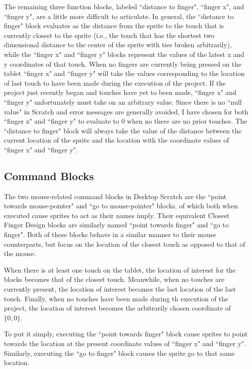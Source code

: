 The remaining three function blocks, labeled ``distance to finger", ``finger x", and ``finger y", are a little more difficult to articulate. In general, the ``distance to finger" block evaluates as the distance from the sprite to the touch that is currently closest to the sprite (i.e., the touch that has the shortest two dimensional distance to the center of the sprite with ties broken arbitrarily), while the ``finger x" and ``finger y" blocks represent the values of the latest x and y coordinates of that touch. When no fingers are currently being pressed on the tablet ``finger x" and ``finger y" will take the values corresponding to the location of last touch to have been made during the execution of the project. If the project just recently began and touches have yet to been made, ``finger x" and ``finger y" unfortunately must take on an arbitrary value. Since there is no ``null value" in Scratch and error messages are generally avoided, I have chosen for both ``finger x" and ``finger y" to evaluate to $0$ when no there are no prior touches. The ``distance to finger" block will always take the value of the distance between the current location of the sprite and the location with the coordinate values of ``finger x" and ``finger y".

\subsection{Command Blocks}
The two mouse-related command blocks in Desktop Scratch are the ``point towards mouse-pointer" and ``go to mouse-pointer" blocks, of which both when executed cause sprites to act as their names imply. Their equivalent Closest Finger Design blocks are similarly named ``point towards finger" and ``go to finger". Both of these blocks behave in a similar manner to their mouse counterparts, but focus on the location of the closest touch as opposed to that of the mouse.  

When there is at least one touch on the tablet, the location of interest for the blocks becomes that of the closest touch. Meanwhile, when no touches are currently present, the location of interest becomes the last location of the last touch. Finally, when no touches have been made during th execution of the project, the location of interest becomes the arbitrarily chosen coordinate of $\{0,0\}$.

To put it simply, executing the ``point towards finger" block cause sprites to point towards the location at the present coordinate values of ``finger x" and ``finger y". Similarly, executing the ``go to finger" block causes the sprite go to that same location. 

